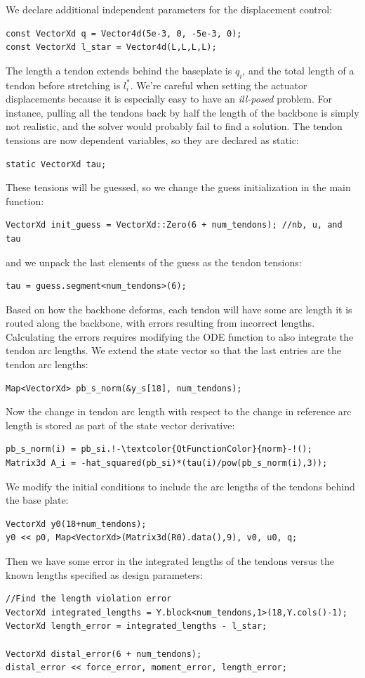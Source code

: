 \documentclass[12pt]{article}
\begin{document}
We declare additional independent parameters for the displacement control:
\begin{lstlisting}
const VectorXd q = Vector4d(5e-3, 0, -5e-3, 0);
const VectorXd l_star = Vector4d(L,L,L,L);
\end{lstlisting}
The length a tendon extends behind the baseplate is $q_i$, and the total length of a tendon before stretching is $l_i^*$. We're careful when setting the actuator displacements because it is especially easy to have an \emph{ill-posed} problem. For instance, pulling all the tendons back by half the length of the backbone is simply not realistic, and the solver would probably fail to find a solution.
The tendon tensions are now dependent variables, so they are declared as static:
\begin{lstlisting}
static VectorXd tau;
\end{lstlisting}
These tensions will be guessed, so we change the guess initialization in the main function:
\begin{lstlisting}
VectorXd init_guess = VectorXd::Zero(6 + num_tendons); //nb, u, and tau
\end{lstlisting}
and we unpack the last elements of the guess as the tendon tensions:
\begin{lstlisting}
tau = guess.segment<num_tendons>(6);
\end{lstlisting}
Based on how the backbone deforms, each tendon will have some arc length it is routed along the backbone, with errors resulting from incorrect lengths. Calculating the errors requires modifying the ODE function to also integrate the tendon arc lengths. We extend the state vector so that the last entries are the tendon arc lengths: 
\begin{lstlisting}
Map<VectorXd> pb_s_norm(&y_s[18], num_tendons);
\end{lstlisting}
Now the change in tendon arc length with respect to the change in reference arc length is stored as part of the state vector derivative:
\begin{lstlisting}
pb_s_norm(i) = pb_si.!-\textcolor{QtFunctionColor}{norm}-!();
Matrix3d A_i = -hat_squared(pb_si)*(tau(i)/pow(pb_s_norm(i),3));
\end{lstlisting}
We modify the initial conditions to include the arc lengths of the tendons behind the base plate:
\begin{lstlisting}
VectorXd y0(18+num_tendons);
y0 << p0, Map<VectorXd>(Matrix3d(R0).data(),9), v0, u0, q;
\end{lstlisting}
Then we have some error in the integrated lengths of the tendons versus the known lengths specified as design parameters:
\begin{lstlisting}
//Find the length violation error
VectorXd integrated_lengths = Y.block<num_tendons,1>(18,Y.cols()-1);
VectorXd length_error = integrated_lengths - l_star;

VectorXd distal_error(6 + num_tendons);
distal_error << force_error, moment_error, length_error;
\end{lstlisting}
\end{document}
